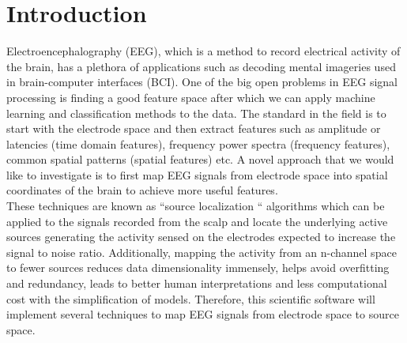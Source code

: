 \documentclass[12pt]{article}
\begin{document}
%
%
%

\section{Introduction}
Electroencephalography (EEG), which is a method to record electrical activity of the brain, has a plethora of applications such as decoding mental imageries used in brain-computer interfaces (BCI). One of the big open problems in EEG signal processing is finding a good feature space after which we can apply machine learning and classification methods to the data. The standard in the field is to start with the electrode space and then extract features such as amplitude or latencies (time domain features), frequency power spectra (frequency features), common spatial patterns (spatial features) etc. A novel approach that we would like to investigate is to first map EEG signals from electrode space into spatial coordinates of the brain to achieve more useful features.\\

These techniques are known as “source localization “ algorithms which can be applied to the signals recorded from the scalp and locate the underlying active sources generating the activity sensed on the electrodes expected to increase the signal to noise ratio. Additionally, mapping the activity from an n-channel space to fewer sources reduces data dimensionality immensely, helps avoid overfitting and redundancy, leads to better human interpretations and less computational cost with the simplification of models. Therefore, this scientific software will implement several techniques to map EEG signals from electrode space to source space.\\
\end{document}
